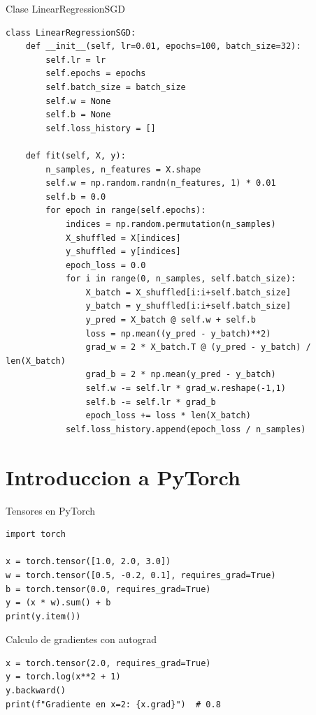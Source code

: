 \documentclass[aspectratio=169, 10pt, xcolor=table]{beamer}
\begin{document}
\begin{frame}[fragile]{Clase LinearRegressionSGD}
    \begin{lstlisting}
class LinearRegressionSGD:
    def __init__(self, lr=0.01, epochs=100, batch_size=32):
        self.lr = lr
        self.epochs = epochs
        self.batch_size = batch_size
        self.w = None
        self.b = None
        self.loss_history = []

    def fit(self, X, y):
        n_samples, n_features = X.shape
        self.w = np.random.randn(n_features, 1) * 0.01
        self.b = 0.0
        for epoch in range(self.epochs):
            indices = np.random.permutation(n_samples)
            X_shuffled = X[indices]
            y_shuffled = y[indices]
            epoch_loss = 0.0
            for i in range(0, n_samples, self.batch_size):
                X_batch = X_shuffled[i:i+self.batch_size]
                y_batch = y_shuffled[i:i+self.batch_size]
                y_pred = X_batch @ self.w + self.b
                loss = np.mean((y_pred - y_batch)**2)
                grad_w = 2 * X_batch.T @ (y_pred - y_batch) / len(X_batch)
                grad_b = 2 * np.mean(y_pred - y_batch)
                self.w -= self.lr * grad_w.reshape(-1,1)
                self.b -= self.lr * grad_b
                epoch_loss += loss * len(X_batch)
            self.loss_history.append(epoch_loss / n_samples)
    \end{lstlisting}
\end{frame}

\section{Introduccion a PyTorch}

\begin{frame}[fragile]{Tensores en PyTorch}
    \begin{lstlisting}
import torch

x = torch.tensor([1.0, 2.0, 3.0])
w = torch.tensor([0.5, -0.2, 0.1], requires_grad=True)
b = torch.tensor(0.0, requires_grad=True)
y = (x * w).sum() + b
print(y.item())
    \end{lstlisting}
\end{frame}

\begin{frame}[fragile]{Calculo de gradientes con autograd}
    \begin{lstlisting}
x = torch.tensor(2.0, requires_grad=True)
y = torch.log(x**2 + 1)
y.backward()
print(f"Gradiente en x=2: {x.grad}")  # 0.8
    \end{lstlisting}
\end{frame}
\end{document}
